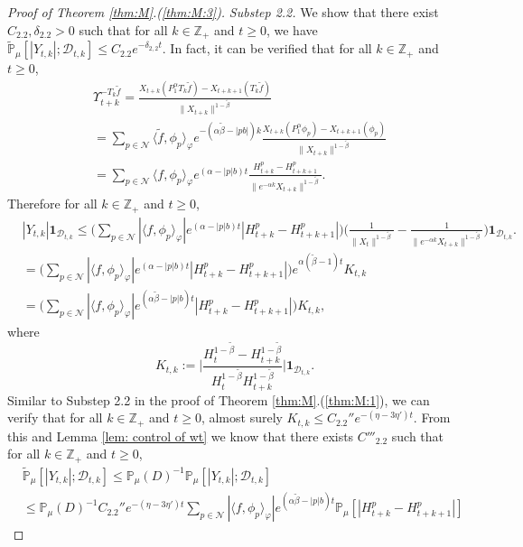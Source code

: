 \documentclass[EJP]{ejpecp} %
\begin{document}
\begin{proof}[Proof of Theorem \ref{thm:M}.(\ref{thm:M:3})]
  \emph{Substep 2.2.} We show that there exist $C_{2.2}, \delta_{2.2}>0$ such that for all $k \in \mathbb Z_+$ and $t\geq 0$, we have $\widetilde {\mathbb {P}}_\mu[|Y_{t,k}|; \mathcal D_{t,k}]\leq C_{2.2}e^{- \delta_{2,2} t}$.
  In fact, it can be verified that for all $k \in \mathbb Z_+$ and $t\geq 0$,
  \begin{align}
    & \Upsilon_{t+k}^{-T_k\tilde f}
      = \frac{X_{t+k}(P^\alpha_1T_k\tilde f) - X_{t+k+1}(T_k \tilde f)}{\|X_{t+k}\|^{1 - \tilde \beta}}
    \\& = \sum_{p\in \mathcal N}
    \langle\tilde f,\phi_p\rangle_\varphi e^{-(\alpha \tilde \beta - |pb|)k}\frac{ X_{t+k}(P_1^\alpha \phi_p) - X_{t+k+1}(\phi_p)}{\|X_{t+k}\|^{1 - \tilde \beta}}
    \\& = \sum_{p\in \mathcal N}
    \langle f,\phi_p\rangle_\varphi  e^{(\alpha  -|p|b)t}\frac{H_{t+k}^p-H_{t+k+1}^p }{\|e^{-\alpha k}X_{t+k}\|^{1 - \tilde \beta}}.
  \end{align}
  Therefore for all $k\in \mathbb Z_+$ and $t\geq 0$,
  \begin{align}
    &|Y_{t,k}| \mathbf 1_{\mathcal D_{t,k}}
      \leq \Big( \sum_{p\in \mathcal N}|\langle f,\phi_p\rangle_\varphi|  e^{(\alpha  -|p|b)t} | H_{t+k}^p-H_{t+k+1}^p |\Big) \Big( \frac{1}{\|X_t\|^{1 - \tilde \beta}} - \frac{1}{\|e^{-\alpha k}X_{t+k}\|^{1 - \tilde \beta}} \Big)\mathbf 1_{\mathcal D_{t,k}}.
    \\ &= \Big( \sum_{p\in \mathcal N}|\langle f,\phi_p\rangle_\varphi|  e^{(\alpha  -|p|b)t} | H_{t+k}^p-H_{t+k+1}^p |\Big)e^{\alpha (\tilde \beta - 1)t} K_{t,k}
    \\ &= \Big( \sum_{p\in \mathcal N}|\langle f,\phi_p\rangle_\varphi|  e^{(\alpha \tilde \beta  -|p|b)t} | H_{t+k}^p-H_{t+k+1}^p |\Big) K_{t,k},
  \end{align}
  where
  \[
    K_{t,k}
    := \Big| \frac {H_t^{1- \tilde \beta} - H_{t+k}^{1 - \tilde \beta}} {H_t^{1 - \tilde \beta} H_{t+k}^{ 1- \tilde \beta }} \Big| \mathbf{1}_{\mathcal{D}_{t,k}}.
  \]
  Similar to Substep 2.2 in the proof of Theorem \ref{thm:M}.(\ref{thm:M:1}), we can verify that for all $k\in \mathbb Z_+$ and $t\geq 0$, almost surely $K_{t,k} \leq C_{2.2}'' e^{- (\eta - 3\eta')t}$.
  From this and Lemma \ref{lem: control of wt} we know that there exists $C'''_{2.2}$ such that for all $k\in \mathbb Z_+$ and $t\geq 0$,
  \begin{align}
    & \widetilde{\mathbb P}_\mu[|Y_{t,k}|; \mathcal D_{t,k}]
      \leq \mathbb P_\mu(D)^{-1}\mathbb P_\mu[ |Y_{t,k}| ;\mathcal D_{t,k} ]
    \\ & \leq \mathbb P_{\mu}(D)^{-1} C_{2.2}'' e^{- (\eta - 3\eta') t}\sum_{p\in \mathcal {N}} |\langle f,\phi_p\rangle_\varphi|  e^{(\alpha \tilde \beta  -|p|b)t} \mathbb P_\mu[| H_{t+k}^p-H_{t+k+1}^p |]

\end{align}
\end{proof}
\end{document}
